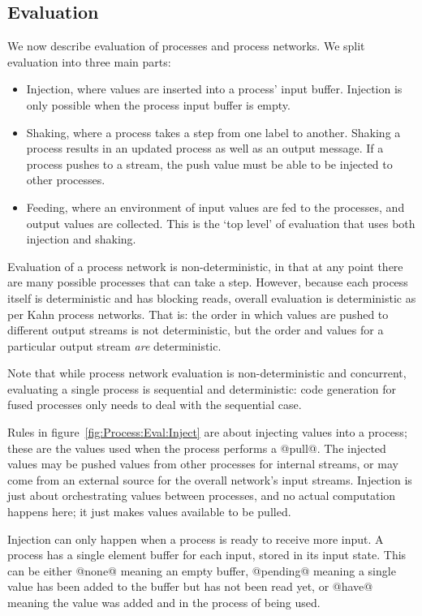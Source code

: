 \subsection{Evaluation}
\label{s:Process:Eval}




We now describe evaluation of processes and process networks.
We split evaluation into three main parts:
\begin{itemize}
\item Injection, where values are inserted into a process' input buffer.
Injection is only possible when the process input buffer is empty.
\item Shaking, where a process takes a step from one label to another.
Shaking a process results in an updated process as well as an output message.
If a process pushes to a stream, the push value must be able to be injected to other processes.
\item Feeding, where an environment of input values are fed to the processes, and output values are collected.
This is the `top level' of evaluation that uses both injection and shaking.
\end{itemize}

Evaluation of a process network is non-deterministic, in that at any point there are many possible processes that can take a step.
However, because each process itself is deterministic and has blocking reads, overall evaluation is deterministic as per Kahn process networks.
That is: the order in which values are pushed to different output streams is not deterministic, but the order and values for a particular output stream \emph{are} deterministic.

Note that while process network evaluation is non-deterministic and concurrent, evaluating a single process is sequential and deterministic: code generation for fused processes only needs to deal with the sequential case.

Rules in figure~\ref{fig:Process:Eval:Inject} are about injecting values into a process; these are the values used when the process performs a @pull@.
The injected values may be pushed values from other processes for internal streams, or may come from an external source for the overall network's input streams.
Injection is just about orchestrating values between processes, and no actual computation happens here; it just makes values available to be pulled.

Injection can only happen when a process is ready to receive more input.
A process has a single element buffer for each input, stored in its input state.
This can be either @none@ meaning an empty buffer, @pending@ meaning a single value has been added to the buffer but has not been read yet, or @have@ meaning the value was added and in the process of being used.

